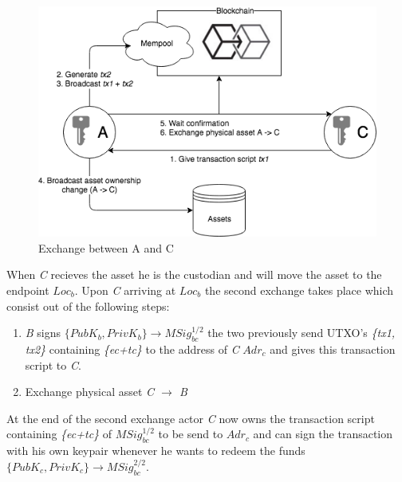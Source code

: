 \begin{figure}[h]
\centering
\includegraphics[width=1\textwidth]{images/exchange_01.png}
\caption{Exchange between A and C}
\label{fig:2 first exchange}
\end{figure}

 When \textit{C} recieves the asset he is the custodian and will move the asset to the endpoint \(Loc_b\). Upon \textit{C} arriving at \(Loc_b\) the second exchange takes place which consist out of the following steps:

\begin{enumerate}
  \item \textit{B} signs \(\{PubK_b, PrivK_b\} \rightarrow MSig_{bc}^{1/2}\) the two previously send UTXO's \textit{\{tx1, tx2\}} containing \textit{\{ec+tc\}} to the address of \textit{C} \(Adr_c\) and gives this transaction script to \textit{C}.
  \item Exchange physical asset \textit{C $\rightarrow$ B}
\end{enumerate}

At the end of the second exchange actor \textit{C} now owns the transaction script containing \textit{\{ec+tc\}} of \(MSig_{bc}^{1/2}\) to be send to \(Adr_c\) and can sign the transaction with his own keypair whenever he wants to redeem the funds \(\{PubK_c, PrivK_c\} \rightarrow MSig_{bc}^{2/2}\).
